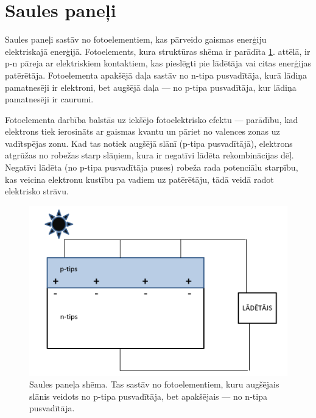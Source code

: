 \section{Saules paneļi}

Saules paneļi sastāv no fotoelementiem, kas pārveido gaismas enerģiju elektriskajā enerģijā. Fotoelements, kura struktūras shēma ir parādīta \ref{fig:PV}. attēlā, ir p-n pāreja ar elektriskiem kontaktiem, kas pieslēgti pie lādētāja vai citas enerģijas patērētāja. Fotoelementa apakšējā daļa sastāv no n-tipa pusvadītāja, kurā lādiņa pamatnesēji ir elektroni, bet augšējā daļa --- no p-tipa pusvadītāja, kur lādiņa pamatnesēji ir caurumi. 

Fotoelementa darbība balstās uz iekšējo fotoelektrisko efektu --- parādību, kad elektrons tiek ierosināts ar gaismas kvantu un pāriet no valences zonas uz vadītspējas zonu. Kad tas notiek augšējā slānī (p-tipa pusvadītājā), elektrons atgrūžas no robežas starp slāņiem, kura ir negatīvi lādēta rekombinācijas dēļ. Negatīvi lādēta (no p-tipa pusvadītāja puses) robeža rada potenciālu starpību, kas veicina elektronu kustību pa vadiem uz patērētāju, tādā veidā radot elektrisko strāvu.

\begin{figure}[h]
    \centering
    \includegraphics[width=0.6\linewidth]{figures/misc/solar_cell.pdf}
    \caption{Saules paneļa shēma. Tas sastāv no fotoelementiem, kuru augšējais slānis veidots no p-tipa pusvadītāja, bet apakšējais --- no n-tipa pusvadītāja.}
    \label{fig:PV}
\end{figure}

